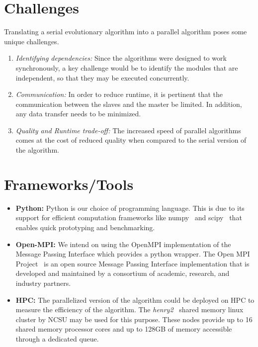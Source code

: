 \documentclass[10pt]{article}
\begin{document}
\section{Challenges}
Translating a serial evolutionary algorithm into a parallel algorithm poses some unique challenges.
\label{challenges}
\vspace{-5mm}
\begin{enumerate}
\itemsep0em
\item \textit{Identifying dependencies:} Since the algorithms were designed to work synchronously, a key challenge would be to identify the modules that are independent, so that they may be executed concurrently.
\item \textit{Communication:} In order to reduce runtime, it is pertinent that the communication between the slaves and the master be limited. In addition, any data transfer needs to be minimized.
\item \textit{Quality and Runtime trade-off:} The increased speed of parallel algorithms comes at the cost of reduced quality when compared to the serial version of the algorithm.
\end{enumerate}

\section{Frameworks/Tools}
\label{tools}
\vspace{-5mm}
\begin{itemize}
\itemsep0em
\item \textbf{Python: }Python is our choice of programming language. This is due to its support for efficient computation frameworks like numpy~\cite{numpy} and scipy~\cite{scipy} that enables quick prototyping and benchmarking.
\item \textbf{Open-MPI: }We intend on using the OpenMPI implementation of the Message Passing Interface which provides a python wrapper. The Open MPI Project~\cite{openMPITool} is an open source Message Passing Interface implementation that is developed and maintained by a consortium of academic, research, and industry partners.
\item \textbf{HPC: }The parallelized version of the algorithm could be deployed on HPC to measure the efficiency of the algorithm. The \textit{henry2}~\cite{ncsuHPC} shared memory linux cluster by NCSU may be used for this purpose. These nodes provide up to 16 shared memory processor cores and up to 128GB of memory accessible through a dedicated queue. 
\end{itemize}



\end{document}
